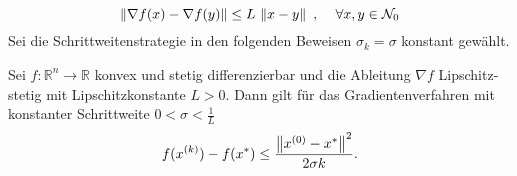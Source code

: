 \begin{equation*}
  \left\lVert\nabla f(x) - \nabla f(y)\right\rVert \leq L\,\left\lVert x-y\right\rVert \text{ , } \quad \forall x,y \in \mathcal{N}_0
\end{equation*}
Sei die Schrittweitenstrategie in den folgenden Beweisen $\sigma_k = \sigma$ konstant gewählt.
\begin{Satz}
\label{thm:konvergenz_grad_verfahren_konvex}
	Sei $f: \mathbb{R}^n \rightarrow \mathbb{R}$ konvex und stetig differenzierbar und die Ableitung $\nabla f$ Lipschitz-stetig mit Lipschitzkonstante $L>0$. Dann gilt für das Gradientenverfahren mit konstanter Schrittweite $0<\sigma<\frac{1}{L}$
  \begin{equation*}
    f(x^{(k)})-f(x^\ast) \leq \frac{\left\lVert x^{(0)}-x^\ast\right\rVert^2}{2\sigma k} \text{.}
  \end{equation*}
\end{Satz}
